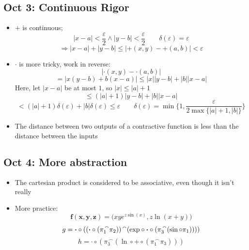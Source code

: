 \documentclass[10pt, oneside]{article}
\let\leq\leqslant
\newcommand{\cat}{^{\,\smallfrown}}
\newcommand{\Cdot}{\boldsymbol{\cdot}}
\renewcommand{\vec}[1]{\mathbf{#1}}
\newcommand{\vecf}[1]{\boldsymbol{#1}}
\begin{document}
\subsection{Oct 3: Continuous Rigor}
\begin{itemize}
    \item $+$ is continuous;
        \[|x-a| < \frac{\varepsilon}{2} \land |y-b| < \frac{\varepsilon}{2} \quad \quad \delta(\varepsilon) = \varepsilon\]
        \[\Rightarrow |x - a| + |y - b| \leq |+(x,y) - +(a,b)| < \varepsilon\]
    \item $\Cdot$ is more tricky, work in reverse:
        \[|\Cdot (x,y) - \Cdot (a,b)|\]
        \[= |x(y-b) + b(x-a)| \leq |x||y-b|+|b||x-a|\]
        Here, let $|x-a|$ be at most $1$, so $|x| \leq |a| + 1$
        \[\leq (|a| + 1)|y-b| + |b||x-a|\]
        \[< (|a| + 1) \delta(\varepsilon) + |b| \delta(\varepsilon) \leq \varepsilon \quad \quad \delta(\varepsilon) = \min \bigg\{ 1,\frac{\varepsilon}{ 2 \max\{ |a|+1,|b| \} } \bigg\} \]
    \item The distance between two outputs of a contractive function is less than the distance between the inputs
\end{itemize}

\subsection{Oct 4: More abstraction}
\begin{itemize}
    \item The cartesian product is considered to be associative, even though it isn't really
    \item More practice:
        \[\vecf{f} (\vec{x},\vec{y},\vec{z}) = \big( x y e^{z \sin(x)} , z \ln (x + y) \big)\]
        \[g = \Cdot \circ ((\Cdot \circ (\pi_1 \cat \pi_2)) \cat (\rm{exp} \circ \Cdot \circ (\pi_3 \cat (\sin \circ \pi_1))))\]
        \[h = \Cdot \circ (\pi_3 \cat (\ln \circ + \circ (\pi_1 \cat \pi_3)))\]
\end{itemize}
\end{document}
